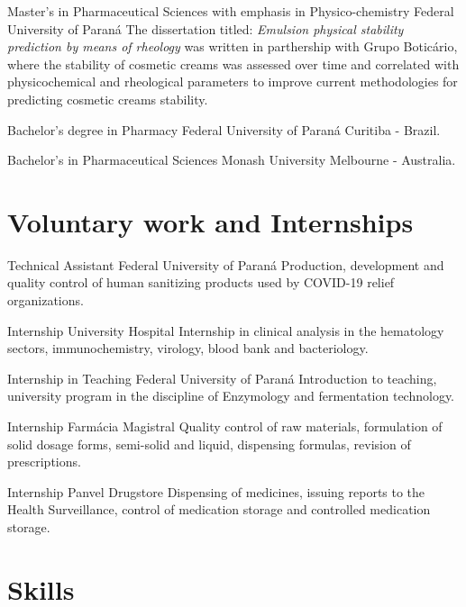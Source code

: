 {Master's in Pharmaceutical Sciences with emphasis in Physico-chemistry}
{Federal University of Paraná}
{The dissertation titled: \emph{Emulsion physical stability prediction by means of rheology}
was written in parthership with Grupo Boticário, where the stability of cosmetic creams was
assessed over time and correlated with physicochemical and rheological parameters to improve 
current methodologies for predicting cosmetic creams stability.}

{Bachelor's degree in Pharmacy}
{Federal University of Paraná}
{Curitiba - Brazil.}

{Bachelor's in Pharmaceutical Sciences}
{Monash University}
{Melbourne - Australia.}

\section{Voluntary work and Internships}

{Technical Assistant}
{Federal University of Paraná}
{Production, development and quality control of human sanitizing products
used by COVID-19 relief organizations.}

{Internship}
{University Hospital}
{Internship in clinical analysis in the hematology sectors,
immunochemistry, virology, blood bank and bacteriology.}

{Internship in Teaching}
{Federal University of Paraná}
{Introduction to teaching, university program
in the discipline of Enzymology and fermentation technology.}

{Internship}
{Farmácia Magistral}
{Quality control of raw materials,
formulation of solid dosage forms,
semi-solid and liquid, dispensing formulas,
revision of prescriptions.}

{Internship}
{Panvel Drugstore}
{Dispensing of medicines,
issuing reports to the Health Surveillance,
control of medication storage and
controlled medication storage.}

\section{Skills}



